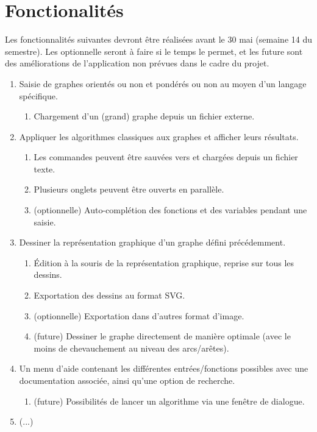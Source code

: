 \documentclass[french]{article}
\begin{document}
	\section{Fonctionalités}
		Les fonctionnalités suivantes devront être réalisées avant le 30 mai (semaine 14 du semestre). Les optionnelle seront à faire si le temps le permet, et les future sont des améliorations de l'application non prévues dans le cadre du projet.
		\begin{enumerate}
			\item Saisie de graphes orientés ou non et pondérés ou non au moyen d'un langage spécifique.
			\begin{enumerate}
				\item Chargement d'un (grand) graphe depuis un fichier externe.
			\end{enumerate}
			
			\item Appliquer les algorithmes classiques aux graphes et afficher leurs résultats.
			\begin{enumerate}
				\item Les commandes peuvent être sauvées vers et chargées depuis un fichier texte.
				\item Plusieurs onglets peuvent être ouverts en parallèle.
				\item (optionnelle) Auto-complétion des fonctions et des variables pendant une saisie.
			\end{enumerate}
			
			\item Dessiner la représentation graphique d'un graphe défini précédemment.
			\begin{enumerate}
				\item Édition à la souris de la représentation graphique, reprise sur tous les dessins.
				\item Exportation des dessins au format SVG.
				\item (optionnelle) Exportation dans d'autres format d'image.
				\item (future) Dessiner le graphe directement de manière optimale (avec le moins de chevauchement au niveau des arcs/arêtes).
			\end{enumerate}
			
			\item Un menu d'aide contenant les différentes entrées/fonctions possibles avec une documentation associée, ainsi qu'une option de recherche.
			\begin{enumerate}
				\item (future) Possibilités de lancer un algorithme via une fenêtre de dialogue.
			\end{enumerate}
		
			\item (...)
		\end{enumerate}
		
\end{document}
